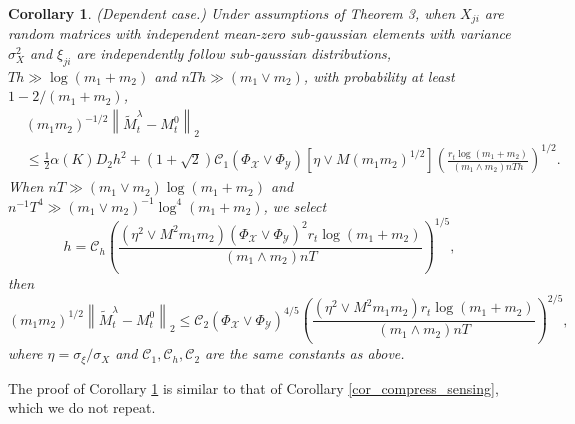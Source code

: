 \documentclass[12pt]{article}
\newtheorem{cor}{Corollary}
\begin{document}
  \begin{cor}
  \label{cor_compress_sensing_mixing}(Dependent case.)
  Under assumptions of Theorem 3,  when $X_{ji}$ are random matrices with independent mean-zero sub-gaussian elements with variance $\sigma_X^2$ and $\xi_{ji}$ are independently follow sub-gaussian distributions, $Th \gg \log (m_1+m_2)$ and $nTh \gg(m_1\vee m_2)$, with probability at least $1-2/(m_1+m_2)$,
  \begin{align*}     
  &(m_1m_2)^{-1/2}\left\|\widetilde{M}_t^\lambda - M_t^0\right\|_2\\& \le \frac{1}{2}\alpha(K)D_2h^2 +\left(1+\sqrt{2}\right)\mathcal{C}_1(\Phi_{\mathcal{X}}\vee \Phi_{\mathcal{Y}})\left[\eta\vee M (m_1 m_2)^{1/2}\right]\left(\frac{r_t\log(m_1+m_2)}{(m_1\wedge m_2)nTh}\right)^{1/2}.
  \end{align*}
  When $nT\gg (m_1\vee m_2)\log (m_1+m_2)$ and $n^{-1}T^4\gg (m_1\vee m_2)^{-1}\log^4(m_1+m_2)$, we select 
  \begin{equation*}
    h = \mathcal{C}_h\left(\frac{\left(\eta^2 \vee M^2 m_1 m_2\right)(\Phi_{\mathcal{X}}\vee \Phi_{\mathcal{Y}})^2r_t\log(m_1+m_2)}{(m_1\wedge m_2)nT}\right)^{1/5},
  \end{equation*}
  then 
  \begin{equation*}%
     (m_1m_2)^{1/2}\left\|\widetilde{M}_t^\lambda - M_t^0\right\|_2 \le \mathcal{C}_2(\Phi_{\mathcal{X}}\vee \Phi_{\mathcal{Y}})^{4/5} \left(\frac{\left(\eta^2 \vee M^2 m_1 m_2\right)r_t\log(m_1+m_2)}{(m_1\wedge m_2)nT}\right)^{2/5},
  \end{equation*}
  where $\eta = \sigma_\xi/\sigma_X$ and $\mathcal{C}_1,\mathcal{C}_h,\mathcal{C}_2$ are the same constants as above.
  \end{cor}
The proof of Corollary \ref{cor_compress_sensing_mixing} 
is similar to that of Corollary \ref{cor_compress_sensing}, which we do not repeat.
\end{document}
